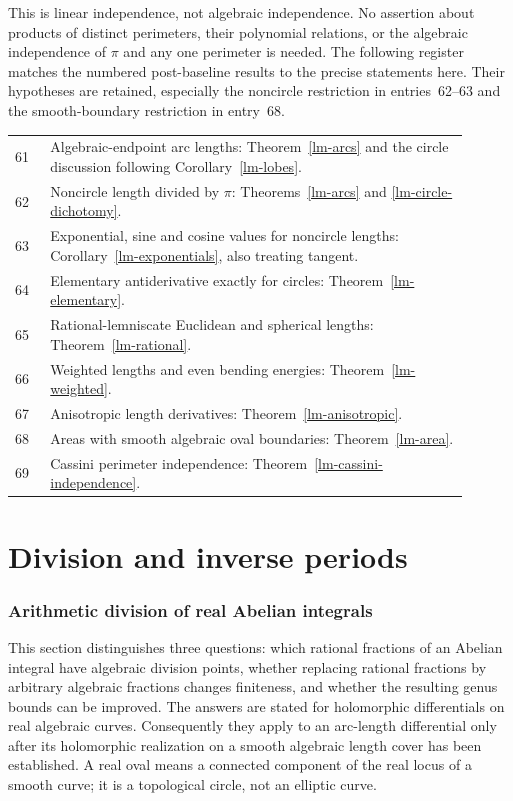 \documentclass[11pt,a4paper]{article}
\theoremstyle{definition}
\theoremstyle{remark}
\numberwithin{equation}{section}
\begin{document}
This is linear independence, not algebraic independence.  No assertion
about products of distinct perimeters, their polynomial relations, or
the algebraic independence of $\pi$ and any one perimeter is needed.
The following register matches the numbered post-baseline results to
the precise statements here.  Their hypotheses are retained, especially
the noncircle restriction in entries~62--63 and the smooth-boundary
restriction in entry~68.
\begin{center}
\begin{tabular}{p{0.07\linewidth}p{0.83\linewidth}}
\hline
61 & Algebraic-endpoint arc lengths: Theorem~\ref{lm-arcs} and the
circle discussion following Corollary~\ref{lm-lobes}.\\
62 & Noncircle length divided by $\pi$: Theorems~\ref{lm-arcs} and
\ref{lm-circle-dichotomy}.\\
63 & Exponential, sine and cosine values for noncircle lengths:
Corollary~\ref{lm-exponentials}, also treating tangent.\\
64 & Elementary antiderivative exactly for circles:
Theorem~\ref{lm-elementary}.\\
65 & Rational-lemniscate Euclidean and spherical lengths:
Theorem~\ref{lm-rational}.\\
66 & Weighted lengths and even bending energies:
Theorem~\ref{lm-weighted}.\\
67 & Anisotropic length derivatives: Theorem~\ref{lm-anisotropic}.\\
68 & Areas with smooth algebraic oval boundaries:
Theorem~\ref{lm-area}.\\
69 & Cassini perimeter independence:
Theorem~\ref{lm-cassini-independence}.\\
\hline
\end{tabular}
\end{center}



\part{Division and inverse periods}

\section{Arithmetic division of real Abelian integrals}
\label{dd-section}

This section distinguishes three questions: which rational fractions of an
Abelian integral have algebraic division points, whether replacing rational
fractions by arbitrary algebraic fractions changes finiteness, and whether
the resulting genus bounds can be improved.  The answers are stated for
holomorphic differentials on real algebraic curves.  Consequently they apply
to an arc-length differential only after its holomorphic realization on a
smooth algebraic length cover has been established.  A real oval means a
connected component of the real locus of a smooth curve; it is a topological
circle, not an elliptic curve.
\end{document}
